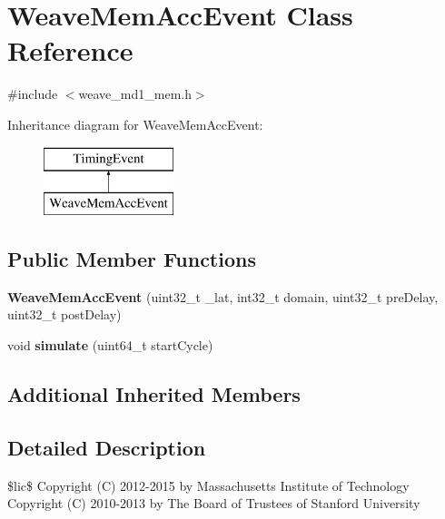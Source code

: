 \hypertarget{classWeaveMemAccEvent}{\section{Weave\-Mem\-Acc\-Event Class Reference}
\label{classWeaveMemAccEvent}
}


{\ttfamily \#include $<$weave\-\_\-md1\-\_\-mem.\-h$>$}

Inheritance diagram for Weave\-Mem\-Acc\-Event\-:\begin{figure}[H]
\begin{center}
\leavevmode
\includegraphics[height=2.000000cm]{classWeaveMemAccEvent}
\end{center}
\end{figure}
\subsection*{Public Member Functions}
\begin{DoxyCompactItemize}
\item 
\hypertarget{classWeaveMemAccEvent_a7a2ded9186ed5d07f16a31ef9b52632c}{{\bfseries Weave\-Mem\-Acc\-Event} (uint32\-\_\-t \-\_\-lat, int32\-\_\-t domain, uint32\-\_\-t pre\-Delay, uint32\-\_\-t post\-Delay)}\label{classWeaveMemAccEvent_a7a2ded9186ed5d07f16a31ef9b52632c}

\item 
\hypertarget{classWeaveMemAccEvent_a6442984d0f26abc0222378325f1f9703}{void {\bfseries simulate} (uint64\-\_\-t start\-Cycle)}\label{classWeaveMemAccEvent_a6442984d0f26abc0222378325f1f9703}

\end{DoxyCompactItemize}
\subsection*{Additional Inherited Members}


\subsection{Detailed Description}
\$lic\$ Copyright (C) 2012-\/2015 by Massachusetts Institute of Technology Copyright (C) 2010-\/2013 by The Board of Trustees of Stanford University


